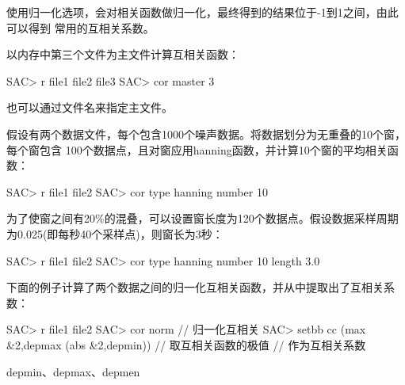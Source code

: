 使用归一化选项，会对相关函数做归一化，最终得到的结果位于-1到1之间，由此可以得到
常用的互相关系数。

以内存中第三个文件为主文件计算互相关函数：
\begin{SACCode}
SAC> r file1 file2 file3
SAC> cor master 3
\end{SACCode}
也可以通过文件名来指定主文件。

假设有两个数据文件，每个包含1000个噪声数据。将数据划分为无重叠的10个窗，每个窗包含
100个数据点，且对窗应用hanning函数，并计算10个窗的平均相关函数：
\begin{SACCode}
SAC> r file1 file2
SAC> cor type hanning number 10
\end{SACCode}

为了使窗之间有20\%的混叠，可以设置窗长度为120个数据点。假设数据采样周期为0.025(即每秒40个采样点)，则窗长为3秒：
\begin{SACCode}
SAC> r file1 file2
SAC> cor type hanning number 10 length 3.0
\end{SACCode}

下面的例子计算了两个数据之间的归一化互相关函数，并从中提取出了互相关系数：
\begin{SACCode}
SAC> r file1 file2
SAC> cor norm                                   // 归一化互相关
SAC> setbb cc (max &2,depmax (abs &2,depmin))   // 取互相关函数的极值
                                                // 作为互相关系数
\end{SACCode}

depmin、depmax、depmen
